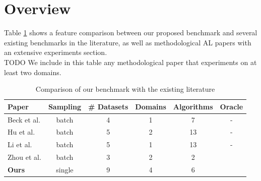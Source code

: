 \documentclass[]{article}
\begin{document}
\section{Overview}
Table \ref{tab:benchmark_comparison} shows a feature comparison between our proposed benchmark and several existing benchmarks in the literature, as well as methodological AL papers with an extensive experiments section. \\
{\color{red} TODO} We include in this table any methodological paper that experiments on at least two domains.
\begin{table}[h]
	\centering
	\begin{tabular}{l | c c c c c}
		Paper & Sampling & \# Datasets & Domains & Algorithms & Oracle \\
		\hline
		Beck et al. \cite{beck2021effective} & batch & 4 & 1 & 7 & - \\
		Hu et al. \cite{hu2021towards} & batch & 5 & 2 & 13 & - \\
		Li et al. \cite{li2022empirical} & batch & 5 & 1 & 13 & - \\
		Zhou et al. \cite{zhou2021towards} & batch & 3 & 2 & 2 & \checkmark \\
		\textbf{Ours} & single & 9 & 4 & 6 & \checkmark 
	\end{tabular}
	\caption{Comparison of our benchmark with the existing literature}
	\label{tab:benchmark_comparison}
\end{table}



\end{document}
